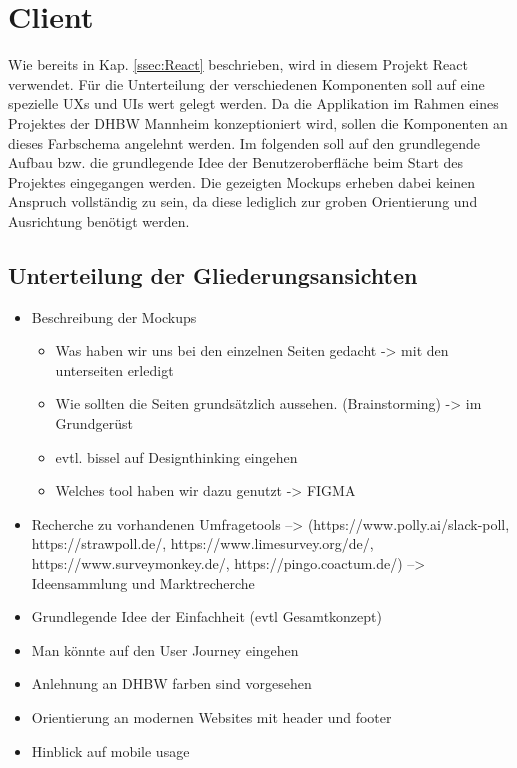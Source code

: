 \section{Client}
\label{sec:ClientKonzept}

Wie bereits in Kap. \vref{ssec:React} beschrieben, wird in diesem Projekt React verwendet. 
Für die Unterteilung der verschiedenen Komponenten soll auf eine spezielle \acfp{UX} und \acfp{UI} wert gelegt werden. 
Da die Applikation im Rahmen eines Projektes der DHBW Mannheim konzeptioniert wird, sollen die Komponenten an dieses Farbschema angelehnt werden. 
Im folgenden soll auf den grundlegende Aufbau bzw. die grundlegende Idee der Benutzeroberfläche beim Start des Projektes eingegangen werden. 
Die gezeigten Mockups erheben dabei keinen Anspruch vollständig zu sein, da diese lediglich zur groben Orientierung und Ausrichtung benötigt werden.













\subsection{Unterteilung der Gliederungsansichten}

\begin{itemize}
	\item Beschreibung der Mockups 
	 \begin{itemize}
		 \item Was haben wir uns bei den einzelnen Seiten gedacht -> mit den unterseiten erledigt
		 \item Wie sollten die Seiten grundsätzlich aussehen. (Brainstorming) -> im Grundgerüst
		 \item evtl. bissel auf Designthinking eingehen 
		 \item Welches tool haben wir dazu genutzt ->  FIGMA
	 \end{itemize}
	 \item Recherche zu vorhandenen Umfragetools --> (https://www.polly.ai/slack-poll, https://strawpoll.de/, https://www.limesurvey.org/de/, https://www.surveymonkey.de/, https://pingo.coactum.de/)
	 --> Ideensammlung und Marktrecherche
	 \item Grundlegende Idee der Einfachheit (evtl Gesamtkonzept)
	 \item Man könnte auf den User Journey eingehen
	 \item Anlehnung an DHBW farben sind vorgesehen
	 \item Orientierung an modernen Websites mit header und footer
	 \item Hinblick auf mobile usage
\end{itemize}

